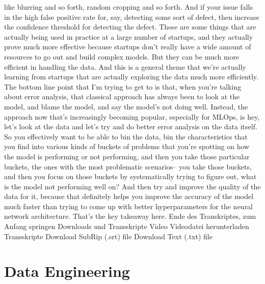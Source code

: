 {{    like blurring and so forth, random cropping and so forth.
    And if your issue falls in the high false positive rate for,
    say, detecting some sort of defect, then increase the confidence threshold
    for detecting the defect.
    These are some things that are actually being
    used in practice at a large number of startups,
    and they actually prove much more effective because startups don't really
    have a wide amount of resources to go out and build complex models.
    But they can be much more efficient in handling the data.
    And this is a general theme that we're actually
    learning from startups that are actually exploring the data much more
    efficiently.
    The bottom line point that I'm trying to get to
    is that, when you're talking about error analysis, that classical approach has
    always been to look at the model, and blame the model,
    and say the model's not doing well.
    Instead, the approach now that's increasingly becoming popular,
    especially for MLOps, is hey, let's look at the data
    and let's try and do better error analysis on the data itself.
    So you effectively want to be able to bin the data, bin the characteristics
    that you find into various kinds of buckets of problems
    that you're spotting on how the model is performing or not performing,
    and then you take those particular buckets, the ones with the most
    problematic scenarios-- you take those buckets,
    and then you focus on those buckets by systematically trying to figure out,
    what is the model not performing well on?
    And then try and improve the quality of the data for it,
    because that definitely helps you improve the accuracy of the model
    much faster than trying to come up with better hyperparameters
    for the neural network architecture.
    That's the key takeaway here.
    Ende des Transkriptes, zum Anfang springen
    Downloads und Transskripte
    Video
    Videodatei herunterladen
    Transskripte
    Download SubRip (.srt) file
    Download Text (.txt) file
    
\section{Data Engineering}

}}
